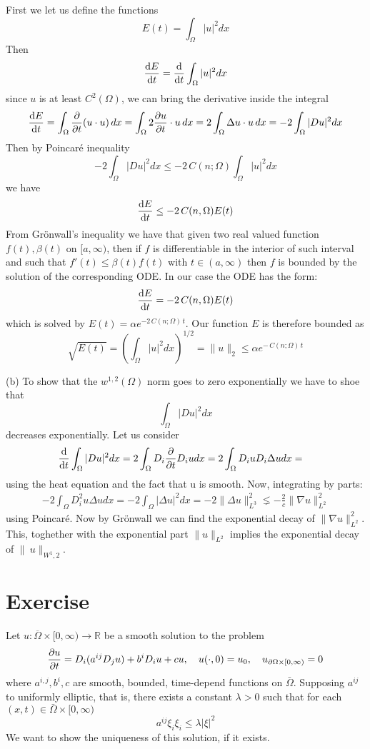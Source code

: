\documentclass{article}
\newcommand{\R}{\mathbb{R}}
\begin{document}
First we let us define the functions
\[
    E(t) = \int_{\Omega} |u|^2 dx
\]
Then
\[
    \odv{E}{t} = \odv{}{t} \int_\Omega |u|^2 dx
\]
since $u$ is at least $C^2(\Omega)$, we can bring the derivative inside the integral
\[
    \odv{E}{t} = \int_\Omega \pdv{}{t}(u \cdot u)\, dx = \int_\Omega 2 \pdv{u}{t} \cdot u\, dx = 2 \int_\Omega \Delta u \cdot u\,dx = -2 \int_\Omega |Du|^2 dx
\]
Then by Poincaré inequality
\[
    - 2 \int_\Omega |Du|^2 dx \leq -2\, C(n;\Omega)\int_\Omega |u|^2 dx
\]
we have 
\[
    \odv{E}{t} \leq -2\, C(n, \Omega) E(t)
\]
From Grönwall's inequality we have that given two real valued function $f(t), \beta(t)$ on $ [a, \infty)$, then if $f$ is differentiable in the interior of such interval and such that $f'(t) \leq \beta(t) f(t)$ with $t \in (a, \infty)$ then $f$ is bounded by the solution of the corresponding ODE. In our case the ODE has the form:
\[
    \odv{E}{t} = -2\, C(n, \Omega) E(t)
\]
which is solved by $E(t) = \alpha e^{-2\,C(n;\Omega)\,t}$. Our function $E$ is therefore bounded as
\[
    \sqrt{E(t)} ={\left( \int_{\Omega} |u|^2 dx \right)}^{1 / 2}= \| u \|_2 \leq \alpha e^{-\,C(n;\Omega)\,t}
\]

(b) To show that the $w^{1,2}(\Omega)$ norm goes to zero exponentially we have to shoe that
\[
    \int_\Omega |Du|^2 dx 
\]
decreases exponentially. Let us consider 
\[
    \begin{split}
        \odv{}{t}\int_\Omega |Du|^2 dx  &= 2 \int_\Omega D_i \pdv{}{t}D_i u dx = 2 \int_\Omega D_i u D_i \Delta u dx = 
    \end{split}
\]
using the heat equation and the fact that u is smooth. Now, integrating by parts:
\[
    \begin{split}
        -2 \int_\Omega D_i^2 u \Delta u dx = -2 \int_\Omega {|\Delta u}|^2 dx = -2 \| \Delta u \|^2_{L^3} \lneq - \frac{2}{c} \| \nabla u \|^2_{L^2}
    \end{split}
\]
using Poincaré. Now by Grönwall we can find the exponential decay of $\| \nabla u\|_{L^2}^2$. This, toghether with the exponential part $\| u \|_{L^2}$ implies the exponential decay of $\|\ u \|_{W^1,2}$.
\section{Exercise}
Let $u : \overline{\Omega} \times [0, \infty) \to \R$ be a smooth solution to the problem
\[
    \pdv{u}{t} = D_i(a^{ij} D_j u) + b^i D_i u +cu , \quad u(\cdot, 0) = u_0, \quad u_{\partial \Omega \times [0, \infty)} = 0
\]
where $a^{i,j}, b^i, c$ are smooth, bounded, time-depend functions on $\bar \Omega$. Supposing $a^{ij}$ to uniformly elliptic, that is, there exists a constant $\lambda > 0$ such that for each $(x,t) \in \bar \Omega \times [0, \infty)$
\[
    a^{ij} \xi_i \xi_i \leq \lambda |\xi|^2
\]
We want to show the uniqueness of this solution, if it exists.
\end{document}
